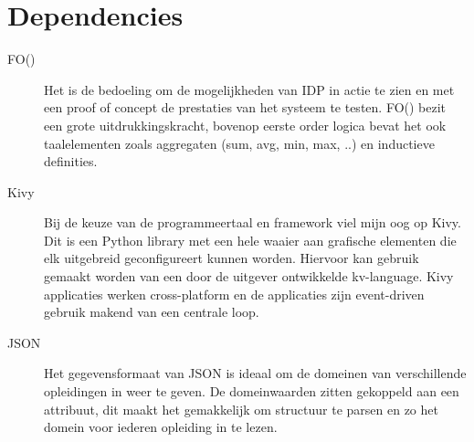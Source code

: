 \section{Dependencies}
\begin{description}
\item [FO(\textperiodcentered)] Het is de bedoeling om de mogelijkheden van IDP in actie te zien en met een proof of concept de prestaties van het systeem te testen. FO(\textperiodcentered) bezit een grote uitdrukkingskracht, bovenop eerste order logica bevat het ook taalelementen zoals aggregaten (sum, avg, min, max, ..) en inductieve definities. 
\item [Kivy] Bij de keuze van de programmeertaal en framework viel mijn oog op Kivy. Dit is een Python library met een hele waaier aan grafische elementen die elk uitgebreid geconfigureert kunnen worden. Hiervoor kan gebruik gemaakt worden van een door de uitgever ontwikkelde kv-language. Kivy applicaties werken cross-platform en de applicaties zijn event-driven gebruik makend van een centrale loop.
\item [JSON] Het gegevensformaat van JSON is ideaal om de domeinen van verschillende opleidingen in weer te geven. De domeinwaarden zitten gekoppeld aan een attribuut, dit maakt het gemakkelijk om structuur te parsen en zo het domein voor iederen opleiding in te lezen.
\end{description}